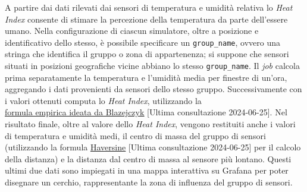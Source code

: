 A partire dai dati rilevati dai sensori di temperatura e umidità relativa lo \textit{Heat Index} consente di stimare la percezione della temperatura da parte dell'essere umano.
Nella configurazione di ciascun simulatore, oltre a posizione e identificativo dello stesso, è possibile specificare un \texttt{group\_name}, ovvero una stringa che identifica
il gruppo o zona di appartenenza; si suppone che sensori situati in posizioni geografiche vicine abbiano lo stesso \texttt{group\_name}. Il \textit{job} calcola prima separatamente
la temperatura e l'umidità media per finestre di un'ora, aggregando i dati provenienti da sensori dello stesso gruppo. Successivamente con i valori ottenuti computa lo \textit{Heat Index},
utilizzando la \\\underline{\href{https://www.ncbi.nlm.nih.gov/pmc/articles/PMC3801457/}{formula empirica ideata da Blazejczyk}} [Ultima consultazione 2024-06-25].
Nel risultato finale, oltre al valore dello \textit{Heat Index}, vengono restituiti anche i valori di temperatura e umidità medi, il centro di massa del gruppo di sensori
(utilizzando la formula \underline{\href{https://en.wikipedia.org/wiki/Haversine_formula}{Haversine}} [Ultima consultazione 2024-06-25] per il calcolo della distanza) e la
distanza dal centro di massa al sensore più lontano. Questi ultimi due dati sono impiegati in una mappa interattiva su Grafana per poter disegnare un cerchio,
rappresentante la zona di influenza del gruppo di sensori.

